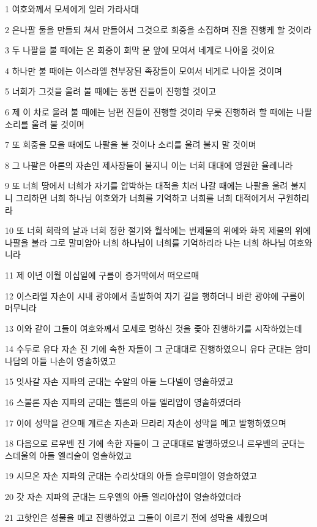 \par 1 여호와께서 모세에게 일러 가라사대
\par 2 은나팔 둘을 만들되 쳐서 만들어서 그것으로 회중을 소집하며 진을 진행케 할 것이라
\par 3 두 나팔을 불 때에는 온 회중이 회막 문 앞에 모여서 네게로 나아올 것이요
\par 4 하나만 불 때에는 이스라엘 천부장된 족장들이 모여서 네게로 나아올 것이며
\par 5 너희가 그것을 울려 불 때에는 동편 진들이 진행할 것이고
\par 6 제 이 차로 울려 불 때에는 남편 진들이 진행할 것이라 무릇 진행하려 할 때에는 나팔 소리를 울려 불 것이며
\par 7 또 회중을 모을 때에도 나팔을 불 것이나 소리를 울려 불지 말 것이며
\par 8 그 나팔은 아론의 자손인 제사장들이 불지니 이는 너희 대대에 영원한 율례니라
\par 9 또 너희 땅에서 너희가 자기를 압박하는 대적을 치러 나갈 때에는 나팔을 울려 불지니 그리하면 너희 하나님 여호와가 너희를 기억하고 너희를 너희 대적에게서 구원하리라
\par 10 또 너희 희락의 날과 너희 정한 절기와 월삭에는 번제물의 위에와 화목 제물의 위에 나팔을 불라 그로 말미암아 너희 하나님이 너희를 기억하리라 나는 너희 하나님 여호와니라
\par 11 제 이년 이월 이십일에 구름이 증거막에서 떠오르매
\par 12 이스라엘 자손이 시내 광야에서 출발하여 자기 길을 행하더니 바란 광야에 구름이 머무니라
\par 13 이와 같이 그들이 여호와께서 모세로 명하신 것을 좇아 진행하기를 시작하였는데
\par 14 수두로 유다 자손 진 기에 속한 자들이 그 군대대로 진행하였으니 유다 군대는 암미나답의 아들 나손이 영솔하였고
\par 15 잇사갈 자손 지파의 군대는 수알의 아들 느다넬이 영솔하였고
\par 16 스불론 자손 지파의 군대는 헬론의 아들 엘리압이 영솔하였더라
\par 17 이에 성막을 걷으매 게르손 자손과 므라리 자손이 성막을 메고 발행하였으며
\par 18 다음으로 르우벤 진 기에 속한 자들이 그 군대대로 발행하였으니 르우벤의 군대는 스데울의 아들 엘리술이 영솔하였고
\par 19 시므온 자손 지파의 군대는 수리삿대의 아들 슬루미엘이 영솔하였고
\par 20 갓 자손 지파의 군대는 드우엘의 아들 엘리아삽이 영솔하였더라
\par 21 고핫인은 성물을 메고 진행하였고 그들이 이르기 전에 성막을 세웠으며

